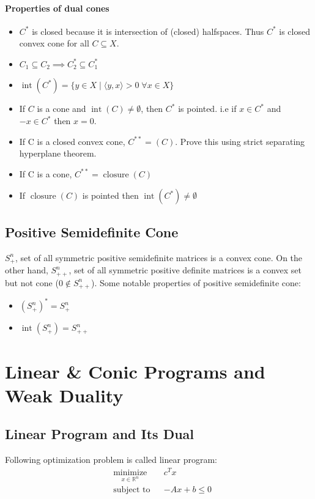 \documentclass[a4paper,11pt]{article}
\newcommand{\intr}{\operatorname{int}}
\newcommand{\Rn}{\mathbb{R}^n}
\newcommand\inrpd[2]{\langle #1, #2 \rangle}
\begin{document}
\paragraph{Properties of dual cones}
\begin{itemize}
\item $C^*$ is closed because it is intersection of (closed) halfspaces. Thus $C^*$ is closed convex cone for all $C \subseteq X$.
\item $C_1 \subseteq C_2 \implies C_2^* \subseteq C_1^*$ 
\item $\intr(C^*) = \{y \in X \mid \inrpd{y}{x} > 0 \; \forall x \in X \}$
\item If $C$ is a cone and $\intr(C) \neq \emptyset$, then $C^*$ is pointed. i.e if $x \in C^*$ and $-x \in C^*$ then $x = 0$.
\item If C is a closed convex cone, $C^{**} = (C)$. Prove this using strict separating hyperplane theorem.
\item If C is a cone, $C^{**} = \operatorname{closure}(C)$
\item If $\operatorname{closure}(C)$ is pointed then $ \intr(C^*) \neq \emptyset$
\end{itemize}

\subsection{Positive Semidefinite Cone}
$S^n_+$, set of all symmetric positive semidefinite matrices is a convex cone. 
On the other hand, $S^n_{++}$, set of all symmetric positive definite matrices is a convex set but not cone ($0 \notin S^n_{++}$). Some notable properties of positive semidefinite cone:
\begin{itemize}
\item $(S^n_+)^* = S^n_+$
\item $\intr(S^n_+) = S^n_{++}$
\end{itemize}

\section{Linear \& Conic Programs and Weak Duality}
\subsection{Linear Program and Its Dual}
Following optimization problem is called linear program:
\begin{equation}
\begin{aligned}
& \underset{x\in \Rn}{\text{minimize}}
& & c^Tx \\
& \text{subject to}
& & -Ax + b \leq 0 
\end{aligned}
\tag{LP}
\end{equation}
\end{document}

